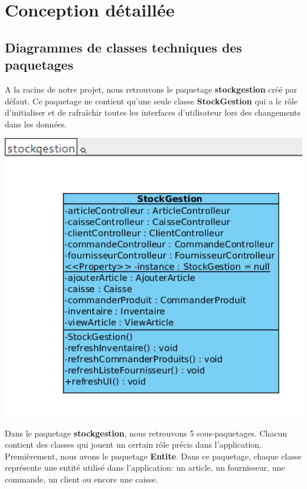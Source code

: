 \chapter{Conception détaillée}

\section{Diagrammes de classes techniques des paquetages}

A la racine de notre projet, nous retrouvons le paquetage \textbf{stockgestion} créé par défaut. Ce paquetage ne contient qu'une seule classe \textbf{StockGestion} qui a le rôle d'initialiser et de rafraîchir toutes les interfaces d'utilisateur lors des changements dans les données.

\begin{center}
\includegraphics[width=14cm]{./Conception/stockgestion}
\end{center}

Dans le paquetage \textbf{stockgestion}, nous retrouvons 5 sous-paquetages. Chacun contient des classes qui jouent un certain rôle précis dans l'application.\\

Premièrement, nous avons le paquetage \textbf{Entite}. Dans ce paquetage, chaque classe représente une entité utilisé dans l'application: un article, un fournisseur, une commande, un client ou encore une caisse.

